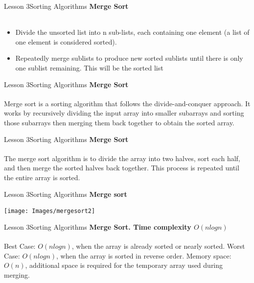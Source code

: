 \documentclass[aspectratio=1610]{beamer}
\begin{document}
\begin{frame}{Lesson 3}{Sorting Algorithms}
\LARGE
\textbf{Merge Sort}\\~\\
\begin{itemize}
\item Divide the unsorted list into n sub-lists, each containing one element (a list of one element is considered sorted).
\item Repeatedly merge sublists to produce new sorted sublists until there is only one sublist remaining. This will be the sorted list
\end{itemize}
\end{frame}


\begin{frame}{Lesson 3}{Sorting Algorithms}
\LARGE
\textbf{Merge Sort}\\~\\
Merge sort is a sorting algorithm that follows the divide-and-conquer 
approach. It works by recursively dividing the input array into 
smaller subarrays and sorting those subarrays then merging them back 
together to obtain the sorted array.
\end{frame}


\begin{frame}{Lesson 3}{Sorting Algorithms}
\LARGE
\textbf{Merge Sort}\\~\\
The merge sort algorithm is to divide the array into two halves, sort 
each half, and then merge the sorted halves back together. This 
process is repeated until the entire array is sorted.
\end{frame}



\begin{frame}{Lesson 3}{Sorting Algorithms}
\LARGE
\textbf{Merge sort}\\
\begin{center}
\texttt{[image: Images/mergesort2]}
\end{center}
\end{frame}



\begin{frame}{Lesson 3}{Sorting Algorithms}
\LARGE
\textbf{Merge Sort. Time complexity $O(n log n)$}\\~\\
Best Case: $O(n log n)$, when the array is already sorted or nearly 
sorted. Worst Case: $O(n log n)$, when the array is sorted in reverse 
order. Memory space: $O(n)$, additional space is required for the
temporary array used during merging.
\end{frame}
\end{document}
